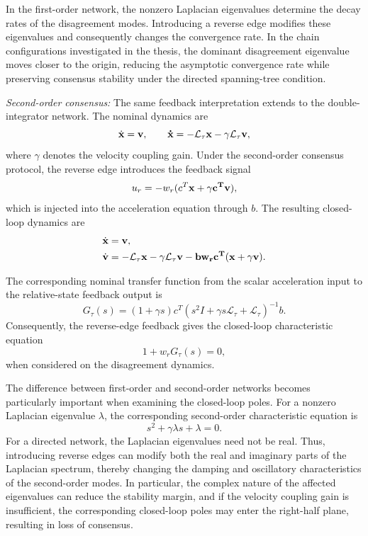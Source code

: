 \documentclass[11pt,a4paper]{article}
\begin{document}
In the first-order network, the nonzero Laplacian eigenvalues determine the decay rates of the disagreement modes. Introducing a reverse edge modifies these eigenvalues and consequently changes the convergence rate. In the chain configurations investigated in the thesis, the dominant disagreement eigenvalue moves closer to the origin, reducing the asymptotic convergence rate while preserving consensus stability under the directed spanning-tree condition.

\textit{Second-order consensus:}
The same feedback interpretation extends to the double-integrator network. The nominal dynamics are
\begin{equation}
\dot{\bf{x}}=\bf{v},\qquad
\dot{\bf{x}}=-\mathcal{L}_{\tau}\bf{x}-\gamma \mathcal{L}_{\tau}\bf{v},
\end{equation}
where $\gamma$ denotes the velocity coupling gain. Under the second-order consensus protocol, the reverse edge introduces the feedback signal
\[
u_r=-w_r(c^T\bf{x}+\gamma c^T \bf{v}),
\]
which is injected into the acceleration equation through $b$. The resulting closed-loop dynamics are
\begin{equation}
\begin{aligned}
\dot{\bf{x}}&=\bf{v},\\
\dot{\bf{v}}&=-\mathcal{L}_{\tau}\bf{x}-\gamma \mathcal{L}_{\tau}\bf{v}
- bw_rc^T(x+\gamma \bf{v}).
\end{aligned}
\label{eq:reverse_edge_second_order}
\end{equation}

The corresponding nominal transfer function from the scalar acceleration input to the relative-state feedback output is
\begin{equation}
G_{\tau}(s)
=(1+\gamma s)c^T
\left(s^2I+\gamma s\mathcal{L}_{\tau}+\mathcal{L}_{\tau}\right)^{-1}b.
\label{eq:second_order_feedback_tf}
\end{equation}
Consequently, the reverse-edge feedback gives the closed-loop characteristic equation
\begin{equation}
1+w_rG_{\tau}(s)=0,
\label{eq:reverse_edge_feedback_second_order}
\end{equation}
when considered on the disagreement dynamics.

The difference between first-order and second-order networks becomes particularly important when examining the closed-loop poles. For a nonzero Laplacian eigenvalue $\lambda$, the corresponding second-order characteristic equation is
\begin{equation}
s^2+\gamma\lambda s+\lambda=0.
\end{equation}
For a directed network, the Laplacian eigenvalues need not be real. Thus, introducing reverse edges can modify both the real and imaginary parts of the Laplacian spectrum, thereby changing the damping and oscillatory characteristics of the second-order modes. In particular, the complex nature of the affected eigenvalues can reduce the stability margin, and if the velocity coupling gain is insufficient, the corresponding closed-loop poles may enter the right-half plane, resulting in loss of consensus.
\end{document}
